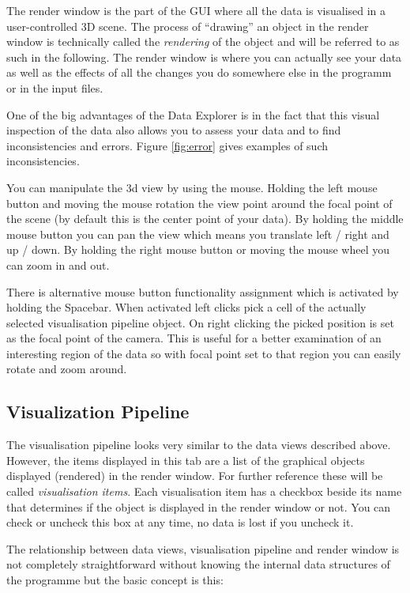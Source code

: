 The render window is the part of the GUI where all the data is visualised in a user-controlled 3D scene. The process of ``drawing'' an object in the render window is technically called the \emph{rendering} of the object and will be referred to as such in the following. The render window is where you can actually see your data as well as the effects of all the changes you do somewhere else in the programm or in the input files.

One of the big advantages of the Data Explorer is in the fact that this visual inspection of the data also allows you to assess your data and to find inconsistencies and errors. Figure \ref{fig:error} gives examples of such inconsistencies.

You can manipulate the 3d view by using the mouse. Holding the left mouse button and moving the mouse rotation the view point around the focal point of the scene (by default this is the center point of your data). By holding the middle mouse button you can pan the view which means you translate left / right and up / down. By holding the right mouse button or moving the mouse wheel you can zoom in and out. 

There is alternative mouse button functionality assignment which is activated by holding the Spacebar. When activated left clicks pick a cell of the actually selected visualisation pipeline object. On right clicking the picked position is set as the focal point of the camera. This is useful for a better examination of an interesting region of the data so with focal point set to that region you can easily rotate and zoom around.

\subsection{Visualization Pipeline}

The visualisation pipeline looks very similar to the data views described above. However, the items displayed in this tab are a list of the graphical objects displayed (rendered) in the render window. For further reference these will be called \emph{visualisation items}. Each visualisation item has a checkbox beside its name that determines if the object is displayed in the render window or not. You can check or uncheck this box at any time, no data is lost if you uncheck it.

The relationship between data views, visualisation pipeline and render window is not completely straightforward without knowing the internal data structures of the programme but the basic concept is this:

